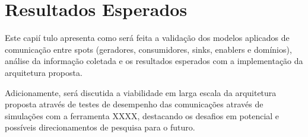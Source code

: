 \chapter{Resultados Esperados}
Este capi\'{i} tulo apresenta como ser\'{a} feita a valida\c{c}\~{a}o dos modelos aplicados de comunica\c{c}\~{a}o entre spots (geradores, consumidores, sinks, enablers e domínios), an\'{a}lise da informa\c{c}\~{a}o coletada e os resultados esperados com a implementa\c{c}\~{a}o da arquitetura proposta.

Adicionamente, ser\'{a} discutida a viabilidade em larga escala da arquitetura proposta atrav\'{e}s de testes de desempenho das comunica\c{c}\~{o}es atrav\'{e}s de simula\c{c}\~{o}es com a ferramenta XXXX, destacando os desafios em potencial e poss\'{i}veis direcionamentos de pesquisa para o futuro.